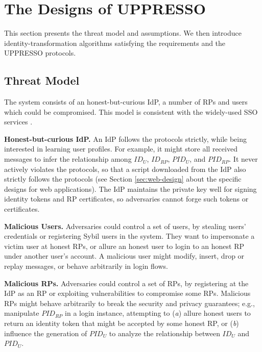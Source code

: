 
\section{The Designs of UPPRESSO}
\label{sec:UPPRESSO}

This section presents the threat model and assumptions.
We then introduce identity-transformation algorithms satisfying the requirements
    and the UPPRESSO protocols.


\subsection{Threat Model}
The system consists of an honest-but-curious IdP, a number of RPs and users which could be compromised. %
This model is consistent with the widely-used SSO services \cite{OpenIDConnect,rfc6749,SAML,SAMLIdentifier,NIST2017draft}.

\noindent \textbf{Honest-but-curious IdP.}
An IdP follows the protocols strictly, while being interested in learning user profiles.
For example, it might store all received messages
 to infer the relationship among $ID_U$, $ID_{RP}$, $PID_{U}$, and $PID_{RP}$.
It never actively violates the protocols,
so that a script downloaded from the IdP also strictly follows the protocols (see Section \ref{sec:web-design} about the specific designs
    for web applications).
The IdP maintains the private key well for signing identity tokens and RP certificates, %
so adversaries cannot forge such tokens or certificates.

\noindent \textbf{Malicious Users.}
Adversaries could control a set of users,
 by stealing users' credentials or registering Sybil users in the system.
They want to impersonate a victim user at honest RPs,
 or allure an honest user to login to an honest RP under another user's account.
A malicious user might
    modify, insert, drop or replay messages, or behave arbitrarily in login flows.

\noindent \textbf{Malicious RPs.}
Adversaries could control a set of RPs, by registering at the IdP as an RP
     or exploiting vulnerabilities to compromise some RPs.
Malicious RPs might behave arbitrarily to break the security and privacy guarantees;
e.g., manipulate $PID_{RP}$ in a login instance,
    attempting to (\emph{a}) allure honest users to return an identity token that might be accepted by some honest RP,
or (\emph{b}) influence the generation of $PID_U$ to
    analyze the relationship between $ID_U$ and $PID_U$.


